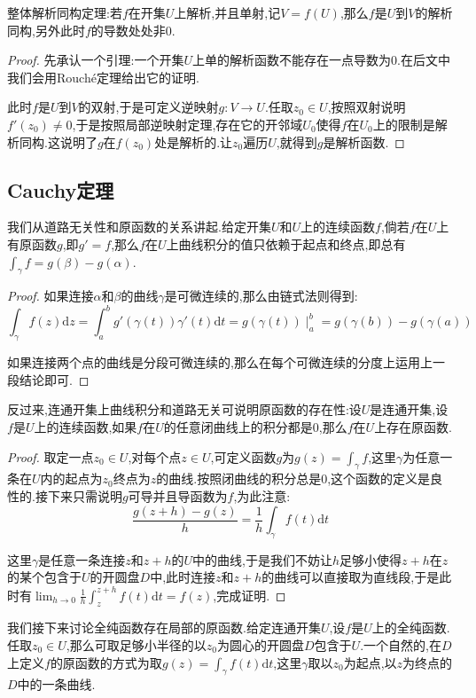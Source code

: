 整体解析同构定理:若$f$在开集$U$上解析,并且单射,记$V=f(U)$,那么$f$是$U$到$V$的解析同构,另外此时$f$的导数处处非0.
\begin{proof}
	
	先承认一个引理:一个开集$U$上单的解析函数不能存在一点导数为0.在后文中我们会用Rouch\'e定理给出它的证明.
	
	此时$f$是$U$到$V$的双射,于是可定义逆映射$g:V\to U$.任取$z_0\in U$,按照双射说明$f'(z_0)\not=0$,于是按照局部逆映射定理,存在它的开邻域$U_0$使得$f$在$U_0$上的限制是解析同构.这说明了$g$在$f(z_0)$处是解析的.让$z_0$遍历$U$,就得到$g$是解析函数.
\end{proof}
\newpage
\subsection{Cauchy定理}

我们从道路无关性和原函数的关系讲起.给定开集$U$和$U$上的连续函数$f$,倘若$f$在$U$上有原函数$g$,即$g'=f$,那么$f$在$U$上曲线积分的值只依赖于起点和终点,即总有$\int_{\gamma}f=g(\beta)-g(\alpha)$.
\begin{proof}
	
	如果连接$\alpha$和$\beta$的曲线$\gamma$是可微连续的,那么由链式法则得到:
	$$\int_{\gamma}f(z)\mathrm{d}z=\int_a^bg'(\gamma(t))\gamma'(t)\mathrm{d}t=g(\gamma(t))\mid_a^b=g(\gamma(b))-g(\gamma(a))$$
	
	如果连接两个点的曲线是分段可微连续的,那么在每个可微连续的分度上运用上一段结论即可.
\end{proof}

反过来,连通开集上曲线积分和道路无关可说明原函数的存在性:设$U$是连通开集,设$f$是$U$上的连续函数,如果$f$在$U$的任意闭曲线上的积分都是0,那么$f$在$U$上存在原函数.
\begin{proof}
	
	取定一点$z_0\in U$,对每个点$z\in U$,可定义函数$g$为$g(z)=\int_{\gamma}f$,这里$\gamma$为任意一条在$U$内的起点为$z_0$终点为$z$的曲线.按照闭曲线的积分总是0,这个函数的定义是良性的.接下来只需说明$g$可导并且导函数为$f$,为此注意:
	$$\frac{g(z+h)-g(z)}{h}=\frac{1}{h}\int_{\gamma}f(t)\mathrm{d}t$$
	
	这里$\gamma$是任意一条连接$z$和$z+h$的$U$中的曲线,于是我们不妨让$h$足够小使得$z+h$在$z$的某个包含于$U$的开圆盘$D$中,此时连接$z$和$z+h$的曲线可以直接取为直线段,于是此时有$\lim_{h\to0}\frac{1}{h}\int_{z}^{z+h}f(t)\mathrm{d}t=f(z)$,完成证明.	
\end{proof}

我们接下来讨论全纯函数存在局部的原函数.给定连通开集$U$,设$f$是$U$上的全纯函数.任取$z_0\in U$,那么可取足够小半径的以$z_0$为圆心的开圆盘$D$包含于$U$.一个自然的,在$D$上定义$f$的原函数的方式为取$g(z)=\int_{\gamma}f(t)\mathrm{d}t$,这里$\gamma$取以$z_0$为起点,以$z$为终点的$D$中的一条曲线.

